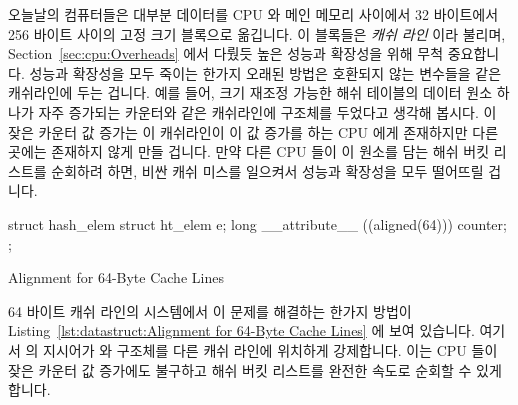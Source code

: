 오늘날의 컴퓨터들은 대부분 데이터를 CPU 와 메인 메모리 사이에서 32 바이트에서
256 바이트 사이의 고정 크기 블록으로 옮깁니다.
이 블록들은 \emph{캐쉬 라인} 이라 불리며,
Section~\ref{sec:cpu:Overheads} 에서 다뤘듯 높은 성능과 확장성을 위해 무척
중요합니다.
성능과 확장성을 모두 죽이는 한가지 오래된 방법은 호환되지 않는 변수들을 같은
캐쉬라인에 두는 겁니다.
예를 들어, 크기 재조정 가능한 해쉬 테이블의 데이터 원소 하나가 자주 증가되는
카운터와 같은 캐쉬라인에  구조체를 두었다고 생각해 봅시다.
이 잦은 카운터 값 증가는 이 캐쉬라인이 이 값 증가를 하는 CPU 에게 존재하지만
다른 곳에는 존재하지 않게 만들 겁니다.
만약 다른 CPU 들이 이 원소를 담는 해쉬 버킷 리스트를 순회하려 하면, 비싼 캐쉬
미스를 일으켜서 성능과 확장성을 모두 떨어뜨릴 겁니다.

\begin{listing}[tb]
\begin{VerbatimL}
struct hash_elem {
	struct ht_elem e;
	long __attribute__ ((aligned(64))) counter;
};
\end{VerbatimL}
\caption{Alignment for 64-Byte Cache Lines}
\label{lst:datastruct:Alignment for 64-Byte Cache Lines}
\end{listing}

64 바이트 캐쉬 라인의 시스템에서 이 문제를 해결하는 한가지 방법이
Listing~\ref{lst:datastruct:Alignment for 64-Byte Cache Lines} 에 보여
있습니다.
여기서 \GCC 의  지시어가  와  구조체를
다른 캐쉬 라인에 위치하게 강제합니다.
이는 CPU 들이 잦은 카운터 값 증가에도 불구하고 해쉬 버킷 리스트를 완전한 속도로
순회할 수 있게 합니다.

